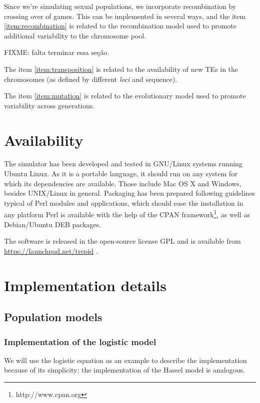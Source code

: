 \documentclass[10pt]{article}
\begin{document}
Since we're simulating sexual populations, we incorporate
recombination by crossing over of games. This can be implemented in
several ways, and the item \ref{item:recombination} is related to the
recombination model used to promote additional variability to the
chromosome pool.

FIXME: falta terminar essa seção.

The item \ref{item:transposition} is related to the availability of
new TEs in the chromosomes (as defined by different \emph{loci} and
sequence).


The item \ref{item:mutation} is related to the evolutionary model used
to promote variability across generations.




\section{Availability}
The simulator has been developed and tested in GNU/Linux systems
running Ubuntu Linux. As it is a portable language, it should run on
any system for which its dependencies are available. Those include Mac
OS X and Windows, besides UNIX/Linux in general. Packaging has been
prepared following guidelines typical of Perl modules and
applications, which should ease the installation in any platform Perl
is available with the help of the CPAN
framework\footnote{http://www.cpan.org}, as well as Debian/Ubuntu DEB
packages.

The software is released in the open-source license GPL and is
available from \url{https://launchpad.net/trepid} .


\section{Implementation details}
\label{sec:implementation}


\subsection{Population models}
\label{sec:impl_pop_models}

\subsubsection{Implementation of the logistic model}

We will use the logistic equation as an example to describe the
implementation because of its simplicity; the implementation of the
Hassel model is analogous.
\end{document}
